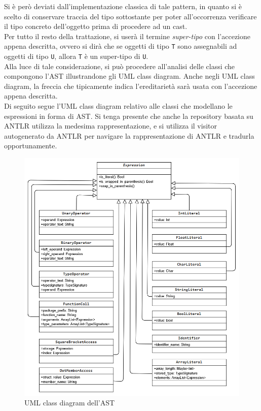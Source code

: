 Si è però deviati dall'implementazione classica di tale pattern, in quanto si è scelto di
conservare traccia del tipo sottostante per poter all'occorrenza verificare il tipo 
concreto dell'oggetto prima di procedere ad un cast. \\

Per tutto il resto della trattazione, si userà il termine \textit{super-tipo} con l'accezione 
appena descritta, ovvero si dirà che se oggetti di tipo \texttt{T} sono assegnabili 
ad oggetti di tipo \texttt{U}, allora \texttt{T} è un super-tipo di \texttt{U}. \\

Alla luce di tale considerazione, si può procedere all'analisi delle classi che
compongono l'AST illustrandone gli UML class diagram. Anche negli UML class diagram, 
la freccia che tipicamente indica l'ereditarietà sarà usata con l'accezione appena
descritta. \\

Di seguito segue l'UML class diagram relativo alle classi che modellano 
le espressioni in forma di AST. Si tenga presente che anche la repository
basata su ANTLR utilizza la medesima rappresentazione, e si utilizza il visitor 
autogenerato da ANTLR per navigare la rappresentazione di ANTLR e tradurla opportunamente.

\begin{figure}[H]
    \centering
        \includegraphics[width=1\textwidth]{../../Assets/AstExpr.png}
    \caption{UML class diagram dell'AST}
\end{figure}

